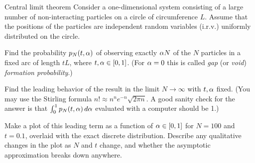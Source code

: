 \documentclass[11pt]{article}
\newcommand{\pN}{p_N}
\begin{document}
\newcommand{\state}[2]{\begin{statement}{#1} #2 \end{statement}}
\newcommand{\prob}[2]{\begin{problem}{#1} #2 \end{problem}}
\newcommand{\subprob}[1]{\begin{subproblem} #1 \end{subproblem}}
\newcommand{\sol}[1]{\begin{solution} #1 \end{solution}}
\newcommand{\fig}[2]{\begin{figure} \centering #2  \label{#1} \end{figure}}



\state{Central limit theorem}{
	Consider a one-dimensional system consisting of a large number of non-interacting particles on a circle of circumference $L$.  Assume that the positions of the particles are independent random variables
(i.r.v.) uniformly distributed on the circle.
}

\prob{}{
	Find the probability $\pN(t, \alp)$ of observing exactly $\alpha N$ of the $N$ particles in a fixed arc of length $t L$, where $t, \alpha \in [0, 1]$.  (For $\alpha = 0$ this is called \emph{gap} (or \emph{void}) \emph{formation probability}.)
	
	Find the leading behavior of the result in the limit $N \to \infty$ with $t, \alpha$ fixed.  (You may use the Stirling formula $n! \approx n^n e^{-n} \sqrt{2\pi n}$.  A good sanity check for the answer is that $\int_0^1 \pN(t, \alp) \dd{\alp}$ evaluated with a computer should be 1.)
	
	Make a plot of this leading term as a function of $\alpha \in [0, 1]$ for $N = 100$ and $t = 0.1$, overlaid with the exact discrete distribution.  Describe any qualitative changes in the plot as $N$ and $t$ change, and whether the asymptotic approximation breaks down anywhere.
}
\end{document}
